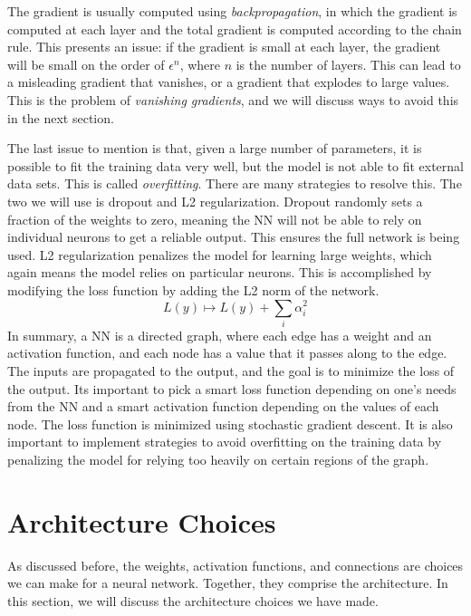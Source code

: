The gradient is usually computed using \textit{backpropagation}, in which the gradient is computed at each layer and the total gradient is computed according to the chain rule. This presents an issue: if the gradient is small at each layer, the gradient will be small on the order of $\epsilon^{n}$, where $n$ is the number of layers. This can lead to a misleading gradient that vanishes, or a gradient that explodes to large values. This is the problem of \textit{vanishing gradients}, and we will discuss ways to avoid this in the next section.

The last issue to mention is that, given a large number of parameters, it is possible to fit the training data very well, but the model is not able to fit external data sets. This is called \textit{overfitting}. There are many strategies to resolve this. The two we will use is dropout and L2 regularization. Dropout randomly sets a fraction of the weights to zero, meaning the NN will not be able to rely on individual neurons to get a reliable output. This ensures the full network is being used. L2 regularization penalizes the model for learning large weights, which again means the model relies on particular neurons. This is accomplished by modifying the loss function by adding the L2 norm of the network.
\begin{equation}
	L(y) \mapsto L(y)+\sum_i \alpha_i^2
\end{equation}
In summary, a NN is a directed graph, where each edge has a weight and an activation function, and each node has a value that it passes along to the edge. The inputs are propagated to the output, and the goal is to minimize the loss of the output. Its important to pick a smart loss function depending on one's needs from the NN and a smart activation function depending on the values of each node. The loss function is minimized using stochastic gradient descent. It is also important to implement strategies to avoid overfitting on the training data by penalizing the model for relying too heavily on certain regions of the graph.
\section{Architecture Choices}
As discussed before, the weights, activation functions, and connections are choices we can make for a neural network. Together, they comprise the architecture. In this section, we will discuss the architecture choices we have made.

